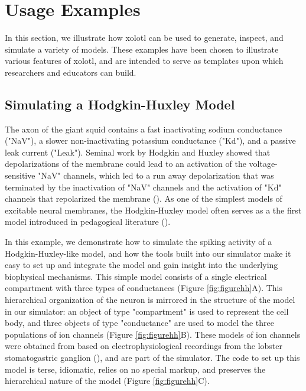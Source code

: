 \documentclass{frontiersSCNS} %
\begin{document}
%
%
%
%
%
%

\section{Usage Examples}
\label{usage}

In this section, we illustrate how xolotl can be used to generate, inspect, and simulate a variety of models. These examples have been chosen to illustrate various features of xolotl, and are intended to serve as templates upon which researchers and educators can build.

%
%
%
%
%
%

\subsection{Simulating a Hodgkin-Huxley Model}

The axon of the giant squid contains a fast inactivating sodium conductance ("NaV"), a slower non-inactivating potassium conductance ("Kd"), and a passive leak current ("Leak"). Seminal work by Hodgkin and Huxley showed that depolarizations of the membrane could lead to an activation of the voltage-sensitive "NaV" channels, which led to a run away depolarization that was terminated by the inactivation of "NaV" channels and the activation of "Kd" channels that repolarized the membrane (\cite{hodgkinComponentsMembraneConductance1952, hodgkinMeasurementCurrentvoltageRelations1952}). As one of the simplest models of excitable neural membranes, the Hodgkin-Huxley model often serves as a the first model introduced in pedagogical literature (\cite{dayanTheoreticalNeuroscience2001, sterrattPrinciplesComputationalModelling2011, trappenbergFundamentalsComputationalNeuroscience2010}).


In this example, we demonstrate how to simulate the spiking activity of a Hodgkin-Huxley-like model, and how the tools built into our simulator make it easy to set up and integrate the model and gain insight into the underlying biophysical mechanisms. This simple model consists of a single electrical compartment with three types of conductances (Figure \ref{fig:figurehh}A). This hierarchical organization of the neuron is mirrored in the structure of the model in our simulator: an object of type "compartment" is used to represent the cell body, and three objects of type "conductance" are used to model the three populations of ion channels (Figure \ref{fig:figurehh}B). These models of ion channels were obtained from \cite{liuModelNeuronActivityDependent1998} based on electrophysiological recordings from the lobster stomatogastric ganglion (\cite{turrigianoSelectiveRegulationCurrent1995}), and are part of the simulator. The code to set up this model is terse, idiomatic, relies on no special markup, and preserves the hierarchical nature of the model (Figure \ref{fig:figurehh}C).
\end{document}
